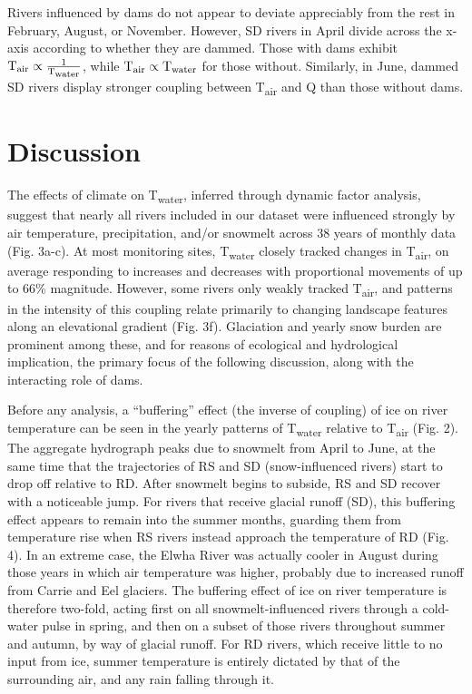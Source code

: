 \documentclass[notitlepage]{article}
\begin{document}
Rivers influenced by dams do not appear to deviate appreciably from the rest in February, August, or November. However, SD rivers in April divide across the x-axis according to whether they are dammed. Those with dams exhibit $\textrm{T}\textsubscript{air} \propto \frac{1}{\textrm{T}\textsubscript{water}}$, while $\textrm{T}\textsubscript{air} \propto \textrm{T}\textsubscript{water}$ for those without. Similarly, in June, dammed SD rivers display stronger coupling between T\textsubscript{air} and Q than those without dams.

\section*{Discussion}

The effects of climate on T\textsubscript{water}, inferred through dynamic factor analysis, suggest that nearly all rivers included in our dataset were influenced strongly by air temperature, precipitation, and/or snowmelt across 38 years of monthly data (Fig. 3a-c). At most monitoring sites, T\textsubscript{water} closely tracked changes in T\textsubscript{air}, on average responding to increases and decreases with proportional movements of up to 66\% magnitude. However, some rivers only weakly tracked T\textsubscript{air}, and patterns in the intensity of this coupling relate primarily to changing landscape features along an elevational gradient (Fig. 3f). Glaciation and yearly snow burden are prominent among these, and for reasons of ecological and hydrological implication, the primary focus of the following discussion, along with the interacting role of dams.

Before any analysis, a ``buffering'' effect (the inverse of coupling) of ice on river temperature can be seen in the yearly patterns of T\textsubscript{water} relative to T\textsubscript{air} (Fig. 2). The aggregate hydrograph peaks due to snowmelt from April to June, at the same time that the trajectories of RS and SD (snow-influenced rivers) start to drop off relative to RD. After snowmelt begins to subside, RS and SD recover with a noticeable jump. For rivers that receive glacial runoff (SD), this buffering effect appears to remain into the summer months, guarding them from temperature rise when RS rivers instead approach the temperature of RD (Fig. 4). In an extreme case, the Elwha River was actually cooler in August during those years in which air temperature was higher, probably due to increased runoff from Carrie and Eel glaciers. The buffering effect of ice on river temperature is therefore two-fold, acting first on all snowmelt-influenced rivers through a cold-water pulse in spring, and then on a subset of those rivers throughout summer and autumn, by way of glacial runoff. For RD rivers, which receive little to no input from ice, summer temperature is entirely dictated by that of the surrounding air, and any rain falling through it.
\end{document}
